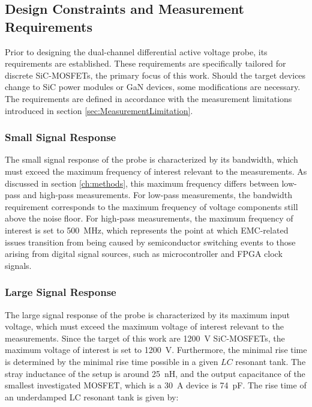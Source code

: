 
\subsection{Design Constraints and Measurement Requirements}
\label{sec:VoltageRequirements}

Prior to designing the dual-channel differential active voltage probe, its requirements are established. 
These requirements are specifically tailored for discrete SiC-MOSFETs, the primary focus of this work. 
Should the target devices change to SiC power modules or GaN devices, some modifications are necessary. 
The requirements are defined in accordance with the measurement limitations introduced in section \ref{sec:MeasurementLimitation}. 

\subsubsection*{Small Signal Response}
The small signal response of the probe is characterized by its bandwidth, which must exceed the maximum frequency of interest  relevant to the measurements.
As discussed in section \ref{ch:methods}, this maximum frequency differs between low-pass and high-pass measurements.
For low-pass measurements, the bandwidth requirement corresponds to the maximum frequency of voltage components still above the noise floor.
For high-pass measurements, the maximum frequency of interest is set to \SI{500}{MHz}, which represents the point at which EMC-related issues transition from being caused by semiconductor switching events to those arising from digital signal sources, such as microcontroller and FPGA clock signals.

\subsubsection*{Large Signal Response}
The large signal response of the probe is characterized by its maximum input voltage, which must exceed the maximum voltage of interest  relevant to the measurements.
Since the target of this work are \SI{1200}{V} SiC-MOSFETs, the maximum voltage of interest is set to \SI{1200}{V}.
Furthermore, the minimal rise time is determined by the minimal rise time possible in a given $LC$ resonant tank.
The stray inductance of the setup is around \SI{25}{nH}, and the output capacitance of the smallest investigated MOSFET, which is a \SI{30}{A} device is \SI{74}{pF}.
The rise time of an underdamped LC resonant tank is given by:


